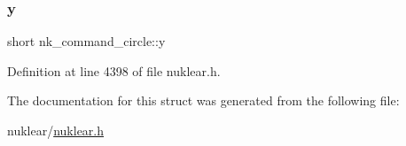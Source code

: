 \subsubsection{\texorpdfstring{y}{y}}
{\footnotesize\ttfamily short nk\+\_\+command\+\_\+circle\+::y}



Definition at line 4398 of file nuklear.\+h.



The documentation for this struct was generated from the following file\+:\begin{DoxyCompactItemize}
\item 
nuklear/\mbox{\hyperlink{nuklear_8h}{nuklear.\+h}}\end{DoxyCompactItemize}
